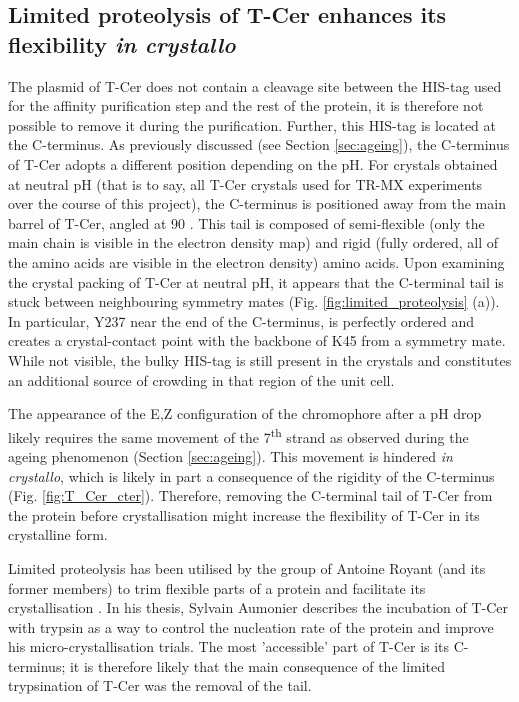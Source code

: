 \subsection{Limited proteolysis of T-Cer enhances its flexibility \textit{in crystallo}}\label{sec:limited_proteolysis}
The plasmid of T-Cer does not contain a cleavage site between the HIS-tag used for the affinity purification step and the rest of the protein, it is therefore not possible to remove it during the purification. Further, this HIS-tag is located at the C-terminus. As previously discussed (see Section \ref{sec:ageing}), the C-terminus of T-Cer adopts a different position depending on the pH. For crystals obtained at neutral pH (that is to say, all T-Cer crystals used for TR-MX experiments over the course of this project), the C-terminus is positioned away from the main \textbeta barrel of T-Cer, angled at 90 \degree. This tail is composed of semi-flexible (only the main chain is visible in the electron density map) and rigid (fully ordered, all of the amino acids are visible in the electron density) amino acids.  Upon examining the crystal packing of T-Cer at neutral pH, it appears that the C-terminal tail is stuck between neighbouring symmetry mates (Fig. \ref{fig:limited_proteolysis} (a)).  In particular, Y237 near the end of the C-terminus, is perfectly ordered and creates a crystal-contact point with the backbone of K45 from a symmetry mate. While not visible, the bulky HIS-tag is still present in the crystals and constitutes an additional source of crowding in that region of the unit cell.  

The appearance of the E,Z configuration of the chromophore after a pH drop likely requires the same movement of the 7\textsuperscript{th} strand as observed during the ageing phenomenon (Section \ref{sec:ageing}). This movement is hindered \textit{in crystallo}, which is likely in part a consequence of the rigidity of the C-terminus (Fig. \ref{fig:T_Cer_cter}). Therefore, removing the C-terminal tail of T-Cer from the protein before crystallisation might increase the flexibility of T-Cer in its crystalline form. 

Limited proteolysis has been utilised by the group of Antoine Royant (and its former members) to trim flexible parts of a protein and facilitate its crystallisation \parencite{aumonierTimeresolvedMonochromaticSynchrotron2019,gotthardCapturingBluelightActivated2023}.  In his thesis, Sylvain Aumonier describes the incubation of T-Cer with trypsin as a way to control the nucleation rate of the protein and improve his micro-crystallisation trials. The most 'accessible' part of T-Cer is its C-terminus; it is therefore likely that the main consequence of the limited trypsination of T-Cer was the removal of the tail. 


